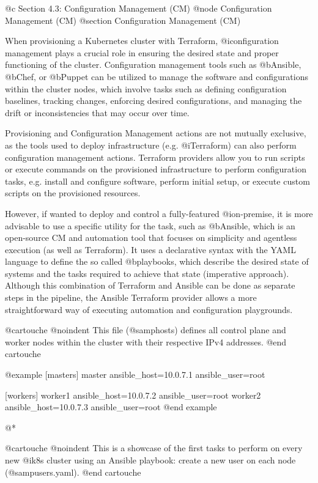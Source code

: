 @c Section 4.3: Configuration Management (CM)
@node Configuration Management (CM)
@section Configuration Management (CM)

When provisioning a Kubernetes cluster with Terraform, @i{configuration management} plays a crucial role in ensuring the desired state and proper functioning of the cluster. Configuration management tools such as @b{Ansible}, @b{Chef}, or @b{Puppet} can be utilized to manage the software and configurations within the cluster nodes, which involve tasks such as defining configuration baselines, tracking changes, enforcing desired configurations, and managing the drift or inconsistencies that may occur over time.

Provisioning and Configuration Management actions are not mutually exclusive, as the tools used to deploy infrastructure (e.g. @i{Terraform}) can also perform configuration management actions. Terraform providers allow you to run scripts or execute commands on the provisioned infrastructure to perform configuration tasks, e.g. install and configure software, perform initial setup, or execute custom scripts on the provisioned resources.

However, if wanted to deploy and control a fully-featured @i{on-premise}, it is more advisable to use a specific utility for the task, such as @b{Ansible}, which is an open-source CM and automation tool that focuses on simplicity and agentless execution (as well as Terraform). It uses a declarative syntax with the YAML language to define the so called @b{playbooks}, which describe the desired state of systems and the tasks required to achieve that state (imperative approach). Although this combination of Terraform and Ansible can be done as separate steps in the pipeline, the Ansible Terraform provider allows a more straightforward way of executing automation and configuration playgrounds.

@cartouche
@noindent This file (@samp{hosts}) defines all control plane and worker nodes within the cluster with their respective IPv4 addresses.
@end cartouche

@example
[masters]
master ansible_host=10.0.7.1 ansible_user=root

[workers]
worker1 ansible_host=10.0.7.2 ansible_user=root
worker2 ansible_host=10.0.7.3 ansible_user=root
@end example

@*

@cartouche
@noindent This is a showcase of the first tasks to perform on every new @i{k8s cluster} using an Ansible playbook: create a new user on each node (@samp{users.yaml}).
@end cartouche

